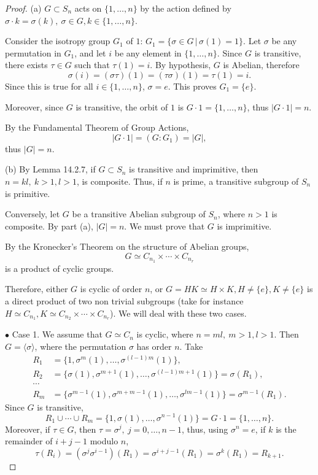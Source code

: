 \documentclass[11pt,a4paper]{article}
\begin{document}
\begin{proof}
\item[(a)] $G \subset S_n$ acts on $\{1,\ldots,n\}$ by the action defined by $\sigma\cdot k = \sigma(k),\ \sigma \in G, k \in \{1,\ldots,n\}$.

Consider the isotropy group $G_1$ of $1$: $G_1 = \{\sigma \in G\, |\, \sigma(1) = 1\}$. Let $\sigma$ be any permutation in $G_1$, and let $i$ be any element in $\{1,\ldots,n\}$. Since $G$ is transitive, there exists $\tau \in G$ such that $\tau(1) = i$. By hypothesis, $G$ is Abelian, therefore
$$\sigma(i) = (\sigma \tau)(1) = (\tau \sigma)(1) = \tau(1) = i.$$
Since this is true for all $i\in \{1,\ldots,n\}$, $\sigma = e$. This proves $G_1 = \{e\}$.

Moreover, since $G$ is transitive, the orbit of $1$ is $G\cdot 1 =\{1,\ldots,n\}$, thus $|G\cdot 1| = n$.

By the Fundamental Theorem of Group Actions,
$$|G\cdot 1 | = (G:G_1) = |G|,$$
thus $|G| = n$.
\item[(b)] By Lemma 14.2.7, if $G \subset S_n$ is transitive and imprimitive, then $n =kl,\ k>1,l>1$, is composite. Thus, if $n$ is prime, a transitive subgroup of $S_n$ is primitive.

Conversely, let $G$ be a transitive Abelian subgroup of $S_n$, where $n>1$ is composite. By part (a), $|G| = n$. We must prove that $G$ is imprimitive.

By the Kronecker's Theorem on the structure of Abelian groups, 
$$G \simeq C_{n_1} \times \cdots \times C_{n_r}$$
is a product of cyclic groups.

Therefore, either $G$ is cyclic of order $n$, or $G = HK \simeq H\times K, H\ne\{e\},K \ne \{e\}$ is a direct product of two non trivial subgroups (take for instance $H \simeq C_{n_1}, K \simeq C_{n_2} \times \cdots \times C_{n_r}$). We will deal with these two cases.

$\bullet$ Case 1.  We assume that $G \simeq C_n$ is cyclic, where $n = ml, \ m>1, l>1$. Then $G = \langle \sigma \rangle$, where the permutation $\sigma$ has order $n$. Take
\begin{align*}
R_1 &= \{1,\sigma^m(1),\ldots, \sigma^{(l-1)m}(1)\},\\
R_2 &= \{\sigma(1), \sigma^{m+1}(1), \ldots,\sigma^{(l-1)m + 1}(1)\} = \sigma(R_1),\\
\cdots\\
R_m&=\{\sigma^{m-1}(1),\sigma^{m + m-1}(1), \ldots,\sigma^{lm - 1}(1)\} = \sigma^{m-1}(R_1).
\end{align*}
Since $G$ is transitive, $$R_1\cup\cdots\cup R_m =\{1,\sigma(1),\ldots,\sigma^{n-1}(1)\} = G\cdot 1 = \{1,\ldots,n\}.$$ Moreover, if $\tau \in G$, then $\tau = \sigma^{j},\ j=0,\ldots,n-1$, thus, using $\sigma^n = e$, if $k$ is the remainder of $i+j-1$ modulo $n$,
$$\tau(R_i) = (\sigma^j \sigma^{i-1})(R_1) = \sigma^{i+j-1}(R_1) = \sigma^{k}(R_1) = R_{k+1}.$$


\end{proof}
\end{document}
